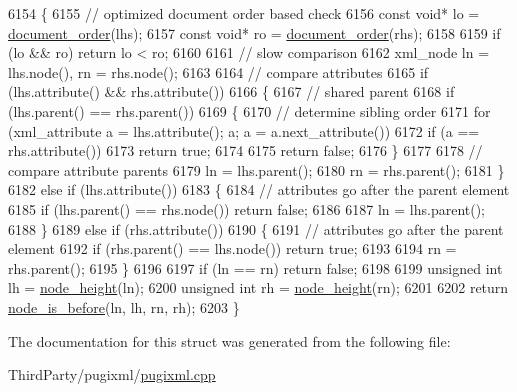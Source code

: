 \begin{DoxyCode}
6154         \{
6155             \textcolor{comment}{// optimized document order based check}
6156             \textcolor{keyword}{const} \textcolor{keywordtype}{void}* lo = \hyperlink{pugixml_8cpp_af28012d575e412e524d54e911266d548}{document\_order}(lhs);
6157             \textcolor{keyword}{const} \textcolor{keywordtype}{void}* ro = \hyperlink{pugixml_8cpp_af28012d575e412e524d54e911266d548}{document\_order}(rhs);
6158 
6159             \textcolor{keywordflow}{if} (lo && ro) \textcolor{keywordflow}{return} lo < ro;
6160 
6161             \textcolor{comment}{// slow comparison}
6162             xml\_node ln = lhs.node(), rn = rhs.node();
6163 
6164             \textcolor{comment}{// compare attributes}
6165             \textcolor{keywordflow}{if} (lhs.attribute() && rhs.attribute())
6166             \{
6167                 \textcolor{comment}{// shared parent}
6168                 \textcolor{keywordflow}{if} (lhs.parent() == rhs.parent())
6169                 \{
6170                     \textcolor{comment}{// determine sibling order}
6171                     \textcolor{keywordflow}{for} (xml\_attribute a = lhs.attribute(); a; a = a.next\_attribute())
6172                         \textcolor{keywordflow}{if} (a == rhs.attribute())
6173                             \textcolor{keywordflow}{return} \textcolor{keyword}{true};
6174                     
6175                     \textcolor{keywordflow}{return} \textcolor{keyword}{false};
6176                 \}
6177                 
6178                 \textcolor{comment}{// compare attribute parents}
6179                 ln = lhs.parent();
6180                 rn = rhs.parent();
6181             \}
6182             \textcolor{keywordflow}{else} \textcolor{keywordflow}{if} (lhs.attribute())
6183             \{
6184                 \textcolor{comment}{// attributes go after the parent element}
6185                 \textcolor{keywordflow}{if} (lhs.parent() == rhs.node()) \textcolor{keywordflow}{return} \textcolor{keyword}{false};
6186                 
6187                 ln = lhs.parent();
6188             \}
6189             \textcolor{keywordflow}{else} \textcolor{keywordflow}{if} (rhs.attribute())
6190             \{
6191                 \textcolor{comment}{// attributes go after the parent element}
6192                 \textcolor{keywordflow}{if} (rhs.parent() == lhs.node()) \textcolor{keywordflow}{return} \textcolor{keyword}{true};
6193                 
6194                 rn = rhs.parent();
6195             \}
6196 
6197             \textcolor{keywordflow}{if} (ln == rn) \textcolor{keywordflow}{return} \textcolor{keyword}{false};
6198             
6199             \textcolor{keywordtype}{unsigned} \textcolor{keywordtype}{int} lh = \hyperlink{pugixml_8cpp_a71b769adcc2bf76bd8b2902980605082}{node\_height}(ln);
6200             \textcolor{keywordtype}{unsigned} \textcolor{keywordtype}{int} rh = \hyperlink{pugixml_8cpp_a71b769adcc2bf76bd8b2902980605082}{node\_height}(rn);
6201             
6202             \textcolor{keywordflow}{return} \hyperlink{pugixml_8cpp_a64dbb9cc2216106e19248c7d5770525d}{node\_is\_before}(ln, lh, rn, rh);
6203         \}
\end{DoxyCode}


The documentation for this struct was generated from the following file\-:\begin{DoxyCompactItemize}
\item 
Third\-Party/pugixml/\hyperlink{pugixml_8cpp}{pugixml.\-cpp}\end{DoxyCompactItemize}

